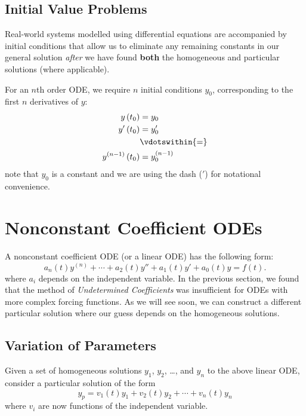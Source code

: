 \documentclass{article}
\begin{document}
\subsection{Initial Value Problems}
Real-world systems modelled using differential equations are accompanied by initial conditions
that allow us to eliminate any remaining constants in our general solution \emph{after}
we have found \textbf{both} the homogeneous and particular solutions (where applicable).

For an \(n\)th order ODE, we require \(n\) initial conditions \(y_0\), corresponding to the first \(n\) derivatives of \(y\):
\begin{align*}
    y\left( t_0 \right)                      & = y_0                      \\
    y'\left( t_0 \right)                     & = y_0'                     \\
                                             & \vdotswithin{=}            \\
    y^{\left( n-1 \right)}\left( t_0 \right) & = y_0^{\left( n-1 \right)}
\end{align*}
note that \(y_0\) is a constant and we are using the dash (\('\)) for notational convenience.
\section{Nonconstant Coefficient ODEs}
A nonconstant coefficient ODE (or a linear ODE) has the following form:
\begin{equation*}
    a_n\left( t \right) y^{\left( n \right)} + \cdots + a_2\left( t \right) y'' + a_1\left( t \right) y' + a_0\left( t \right) y = f\left( t \right).
\end{equation*}
where \(a_i\) depends on the independent variable.
In the previous section, we found that the method of \emph{Undetermined Coefficients} was insufficient for ODEs with more complex
forcing functions. As we will see soon, we can construct a different particular solution where our guess depends on the
homogeneous solutions.
\subsection{Variation of Parameters}
Given a set of homogeneous solutions \(y_1\), \(y_2\), \dots, and \(y_n\) to the above linear ODE,
consider a particular solution of the form
\begin{equation*}
    y_p = v_1\left( t \right) y_1 + v_2\left( t \right) y_2 + \cdots + v_n\left( t \right) y_n
\end{equation*}
where \(v_i\) are now functions of the independent variable.
\end{document}
